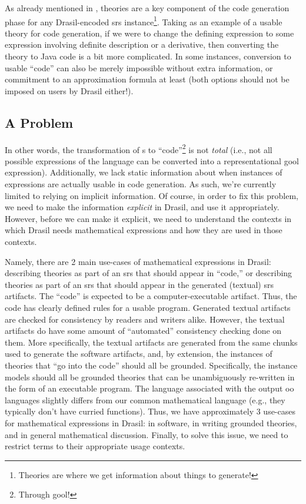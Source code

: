 \pseudoExampleExpression{}

As already mentioned in , theories are a key component of
the code generation phase for any Drasil-encoded \acs{srs}
instance\footnote{Theories are where we get information about things to
generate!}. Taking  as an example of a usable theory
for code generation, if we were to change the defining expression to some
expression involving definite description or a derivative, then converting the
theory to Java code is a bit more complicated. In some instances, conversion to
usable ``code'' can also be merely impossible without extra information, or
commitment to an approximation formula at least (both options should not be
imposed on users by Drasil either!).

\subsection{A Problem}
\label{chap:lang-division:sec:a-mathematical-language:subsec:a-problem}

In other words, the transformation of \Expr{}s to ``code''\footnote{Through
\acs{gool}!} is not \textit{total} (i.e., not all possible expressions of the
\Expr{} language can be converted into a representational \acs{gool}
expression). Additionally, we lack static information about when instances of
expressions are actually usable in code generation. As such, we're currently
limited to relying on implicit information. Of course, in order to fix this
problem, we need to make the information \textit{explicit} in Drasil, and use it
appropriately. However, before we can make it explicit, we need to understand
the contexts in which Drasil needs mathematical expressions and how they are
used in those contexts.

Namely, there are 2 main use-cases of mathematical expressions in Drasil:
describing theories as part of an \acs{srs} that should appear in ``code,'' or
describing theories as part of an \acs{srs} that should appear in the generated
(textual) \acs{srs} artifacts. The ``code'' is expected to be a
computer-executable artifact. Thus, the code has clearly defined rules for a
usable program. Generated textual artifacts are checked for consistency by
readers and writers alike. However, the textual artifacts do have some amount of
``automated'' consistency checking done on them. More specifically, the textual
artifacts are generated from the same chunks used to generate the software
artifacts, and, by extension, the instances of theories that ``go into the
code'' should all be grounded. Specifically, the instance models should all be
grounded theories that can be unambiguously re-written in the form of an
executable program. The language associated with the output \acs{oo} languages
slightly differs from our common mathematical language (e.g., they typically
don't have curried functions). Thus, we have approximately 3 use-cases for
mathematical expressions in Drasil: in software, in writing grounded theories,
and in general mathematical discussion. Finally, to solve this issue, we need to
restrict terms to their appropriate usage contexts.

